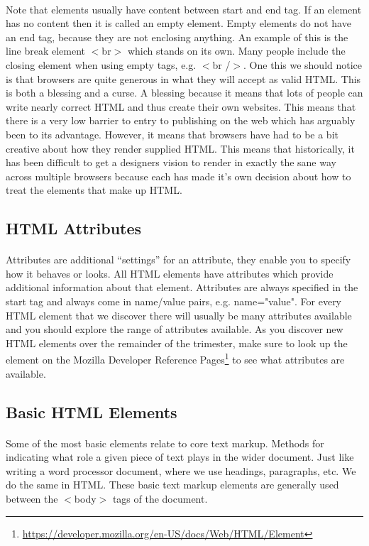 \documentclass[10pt, a4paper, twosize]{article}
\begin{document}
\paragraph{} Note that elements usually have content between start and end tag. If an element has no content then it is called an empty element. Empty elements do not have an end tag, because they are not enclosing anything. An example of this is the line break element $<$br$>$ which stands on its own. Many people include the closing element when using empty tags, e.g. $<$br /$>$. One this we should notice is that browsers are quite generous in what they will accept as valid HTML. This is both a blessing and a curse. A blessing because it means that lots of people can write nearly correct HTML and thus create their own websites. This means that there is a very low barrier to entry to publishing on the web which has arguably been to its advantage. However, it means that browsers have had to be a bit creative about how they render supplied HTML. This means that historically, it has been difficult to get a designers vision to render in exactly the sane way across multiple browsers because each has made it's own decision about how to treat the elements that make up HTML.


\subsection{HTML Attributes}
\paragraph{} Attributes are additional ``settings'' for an attribute, they enable you to specify how it behaves or looks. All HTML elements have attributes which provide additional information about that element. Attributes are always specified in the start tag and always come in name/value pairs, e.g. name="value". For every HTML element that we discover there will usually be many attributes available and you should explore the range of attributes available. As you discover new HTML elements over the remainder of the trimester, make sure to look up the element on the Mozilla Developer Reference Pages\footnote{\url{https://developer.mozilla.org/en-US/docs/Web/HTML/Element}} to see what attributes are available.

\subsection{Basic HTML Elements}
\paragraph{} Some of the most basic elements relate to core text markup. Methods for indicating what role a given piece of text plays in the wider document. Just like writing a word processor document, where we use headings, paragraphs, etc. We do the same in HTML. These basic text markup elements are generally used between the $<$body$>$ tags of the document.
\end{document}
